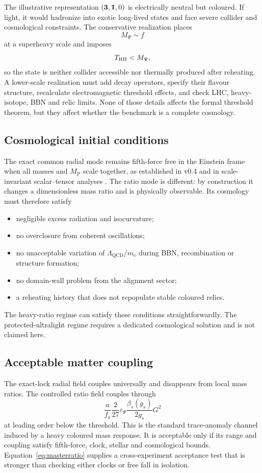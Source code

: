 \documentclass[11pt,a4paper]{article}
\newcommand{\MP}{M_{\mathrm P}}
\newcommand{\QCD}{\mathrm{QCD}}
\begin{document}
The illustrative representation $({\bf3},{\bf1},0)$ is electrically neutral but coloured. If light, it would hadronize into exotic long-lived states and face severe collider and cosmological constraints. The conservative realization places
\[
M_\Psi\sim f
\]
at a superheavy scale and imposes
\[
T_{\rm RH}<M_\Psi,
\]
so the state is neither collider accessible nor thermally produced after reheating. A lower-scale realization must add decay operators, specify their flavour structure, recalculate electromagnetic threshold effects, and check LHC, heavy-isotope, BBN and relic limits. None of those details affects the formal threshold theorem, but they affect whether the benchmark is a complete cosmology.

\subsection{Cosmological initial conditions}

The exact common radial mode remains fifth-force free in the Einstein frame when all masses and $\MP$ scale together, as established in v0.4 and in scale-invariant scalar--tensor analyses \cite{Ferreira2017}. The ratio mode is different: by construction it changes a dimensionless mass ratio and is physically observable. Its cosmology must therefore satisfy

\begin{itemize}
  \item negligible excess radiation and isocurvature;
  \item no overclosure from coherent oscillations;
  \item no unacceptable variation of $\Lambda_{\QCD}/m_e$ during BBN, recombination or structure formation;
  \item no domain-wall problem from the alignment sector;
  \item a reheating history that does not repopulate stable coloured relics.
\end{itemize}

The heavy-ratio regime can satisfy these conditions straightforwardly. The protected-ultralight regime requires a dedicated cosmological solution and is not claimed here.

\subsection{Acceptable matter coupling}

The exact-lock radial field couples universally and disappears from local mass ratios. The controlled ratio field couples through
\[
\frac{a}{f_a}
\frac{2}{27}\varepsilon_\Psi
\frac{\beta_s(g_s)}{2g_s}G^2
\]
at leading order below the threshold. This is the standard trace-anomaly channel induced by a heavy coloured mass response. It is acceptable only if its range and coupling satisfy fifth-force, clock, stellar and cosmological bounds. Equation~\eqref{eq:masterratio} supplies a cross-experiment acceptance test that is stronger than checking either clocks or free fall in isolation.
\end{document}
